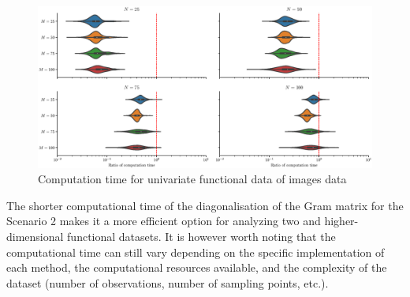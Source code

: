 \begin{results}
{\begin{figure}
     \centering
    \includegraphics[width=\textwidth]{figures/scenario_2/computation_time.eps}
    \caption{Computation time for univariate functional data of images data}
    \label{fig:computation_time_mfd_2d}
\end{figure}
The shorter computational time of the diagonalisation of the Gram matrix for the Scenario 2 makes it a more efficient option for analyzing two and higher-dimensional functional datasets. It is however worth noting that the computational time can still vary depending on the specific implementation of each method, the computational resources available, and the complexity of the dataset (number of observations, number of sampling points, etc.).
}
\end{results}

